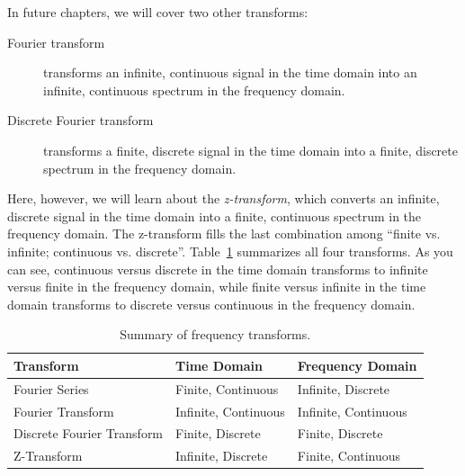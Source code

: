 In future chapters, we will cover two other transforms:
\begin{description}
\item[Fourier transform] transforms an infinite, continuous signal in
the time domain into an infinite, continuous spectrum in the frequency
domain.

\item[Discrete Fourier transform] transforms a finite, discrete signal
in the time domain into a finite, discrete spectrum in the frequency
domain.
\end{description}

Here, however, we will learn about the
\emph{z-transform}, which converts an infinite, discrete signal in the
time domain into a finite, continuous spectrum in the frequency
domain. The z-transform fills the last combination among ``finite vs.
infinite; continuous vs. discrete''. Table~\ref{tb:zt-transforms}
summarizes all four transforms.  As you can see, continuous versus
discrete in the time domain transforms to infinite versus finite in
the frequency domain, while finite versus infinite in the time domain
transforms to discrete versus continuous in the frequency domain.

\begin{table}
\caption{Summary of frequency transforms.
\label{tb:zt-transforms}}
\begin{center}
\begin{tabular}{|l|l|l|} \hline
Transform & Time Domain & Frequency Domain\\ \hline\hline
Fourier Series & Finite, Continuous & Infinite, Discrete \\ 
Fourier Transform & Infinite, Continuous & Infinite, Continuous \\ 
Discrete Fourier Transform & Finite, Discrete & Finite, Discrete \\ 
Z-Transform & Infinite, Discrete & Finite, Continuous \\ \hline
\end{tabular}
\end{center}
\end{table}

